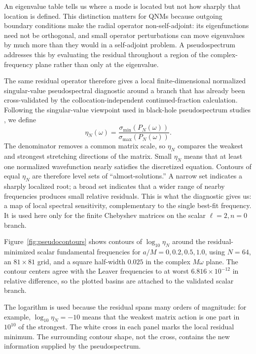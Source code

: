 \documentclass[12pt,a4paper]{article}
\begin{document}
An eigenvalue table tells us where a mode is located but not how sharply that
location is defined.  This distinction matters for QNMs because outgoing
boundary conditions make the radial operator non-self-adjoint: its
eigenfunctions need not be orthogonal, and small operator perturbations can
move eigenvalues by much more than they would in a self-adjoint problem.  A
pseudospectrum addresses this by evaluating the residual throughout a region
of the complex-frequency plane rather than only at the eigenvalue.

The same residual operator therefore gives a local finite-dimensional
normalized singular-value pseudospectral diagnostic around a branch that has
already been cross-validated by the collocation-independent continued-fraction
calculation.  Following the
singular-value viewpoint used in black-hole pseudospectrum studies
\cite{Jaramillo2021,Cao2024}, we define
\begin{equation}
\eta_N(\omega)=\frac{\sigma_{\min}(P_N(\omega))}{\sigma_{\max}(P_N(\omega))}.
\end{equation}
The denominator removes a common matrix scale, so \(\eta_N\) compares the
weakest and strongest stretching directions of the matrix.  Small
\(\eta_N\) means that at least one normalized wavefunction nearly satisfies
the discretized equation.  Contours of equal \(\eta_N\) are therefore level
sets of ``almost-solutions.''  A narrow set indicates a sharply localized
root; a broad set indicates that a wider range of nearby frequencies produces
small relative residuals.  This is what the diagnostic gives us: a map of
local spectral sensitivity, complementary to the single best-fit frequency.
It is used here only for the finite Chebyshev matrices on the scalar
\(\ell=2,n=0\) branch.

Figure~\ref{fig:pseudocontours} shows contours of \(\log_{10}\eta_N\) around the residual-minimized scalar fundamental frequencies for \(a/M=0,0.2,0.5,1.0\), using \(N=64\), an \(81\times81\) grid, and a square half-width \(0.025\) in the complex \(M\omega\) plane. The contour centers agree with the Leaver frequencies to at worst \(6.816\times10^{-12}\) in relative difference, so the plotted basins are attached to the validated scalar branch.

The logarithm is used because the residual spans many orders of magnitude:
for example, \(\log_{10}\eta_N=-10\) means that the weakest matrix action is
one part in \(10^{10}\) of the strongest.  The white cross in each panel marks
the local residual minimum.  The surrounding contour shape, not the cross,
contains the new information supplied by the pseudospectrum.
\end{document}
